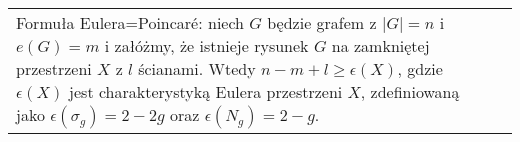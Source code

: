 \medskip

\begin{tabularx}{\textwidth}{ X!{\color{git90gray}\vrule} X}
{\color{def}Formuła Eulera=Poincar\'e}: niech $G$ będzie grafem z $|G|=n$ i $e(G)=m$ i załóżmy, że istnieje rysunek $G$ na zamkniętej przestrzeni $X$ z $l$ ścianami. Wtedy $n-m+l\geq\epsilon(X)$, gdzie $\epsilon(X)$ jest charakterystyką Eulera przestrzeni $X$, zdefiniowaną jako $\epsilon(\sigma_g)=2-2g$ oraz $\epsilon(N_g)=2-g$.
\end{tabularx}